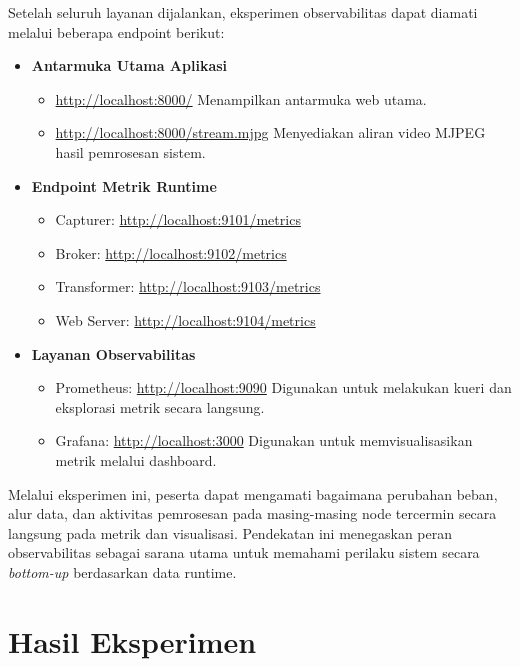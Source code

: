 Setelah seluruh layanan dijalankan, eksperimen observabilitas dapat diamati melalui beberapa endpoint berikut:

\begin{itemize}
  \item \textbf{Antarmuka Utama Aplikasi}
    \begin{itemize}
      \item \url{http://localhost:8000/}  
            Menampilkan antarmuka web utama.
      \item \url{http://localhost:8000/stream.mjpg}  
            Menyediakan aliran video MJPEG hasil pemrosesan sistem.
    \end{itemize}

  \item \textbf{Endpoint Metrik Runtime}
    \begin{itemize}
      \item Capturer: \url{http://localhost:9101/metrics}
      \item Broker: \url{http://localhost:9102/metrics}
      \item Transformer: \url{http://localhost:9103/metrics}
      \item Web Server: \url{http://localhost:9104/metrics}
    \end{itemize}

  \item \textbf{Layanan Observabilitas}
    \begin{itemize}
      \item Prometheus: \url{http://localhost:9090}  
            Digunakan untuk melakukan kueri dan eksplorasi metrik secara langsung.
      \item Grafana: \url{http://localhost:3000}  
            Digunakan untuk memvisualisasikan metrik melalui dashboard.
    \end{itemize}
\end{itemize}

Melalui eksperimen ini, peserta dapat mengamati bagaimana perubahan beban, alur data, dan aktivitas pemrosesan pada masing-masing node tercermin secara langsung pada metrik dan visualisasi. Pendekatan ini menegaskan peran observabilitas sebagai sarana utama untuk memahami perilaku sistem secara \emph{bottom-up} berdasarkan data runtime.


\section{Hasil Eksperimen}

